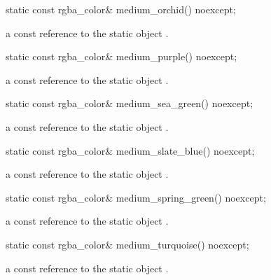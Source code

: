 \begin{itemdecl}
static const rgba_color& medium_orchid() noexcept;
\end{itemdecl}
\begin{itemdescr}
\pnum
\returns
a const reference to the static  object .
\end{itemdescr}

\begin{itemdecl}
static const rgba_color& medium_purple() noexcept;
\end{itemdecl}
\begin{itemdescr}
\pnum
\returns
a const reference to the static  object .
\end{itemdescr}

\begin{itemdecl}
static const rgba_color& medium_sea_green() noexcept;
\end{itemdecl}
\begin{itemdescr}
\pnum
\returns
a const reference to the static  object .
\end{itemdescr}

\begin{itemdecl}
static const rgba_color& medium_slate_blue() noexcept;
\end{itemdecl}
\begin{itemdescr}
\pnum
\returns
a const reference to the static  object .
\end{itemdescr}

\begin{itemdecl}
static const rgba_color& medium_spring_green() noexcept;
\end{itemdecl}
\begin{itemdescr}
\pnum
\returns
a const reference to the static  object .
\end{itemdescr}

\begin{itemdecl}
static const rgba_color& medium_turquoise() noexcept;
\end{itemdecl}
\begin{itemdescr}
\pnum
\returns
a const reference to the static  object .
\end{itemdescr}

